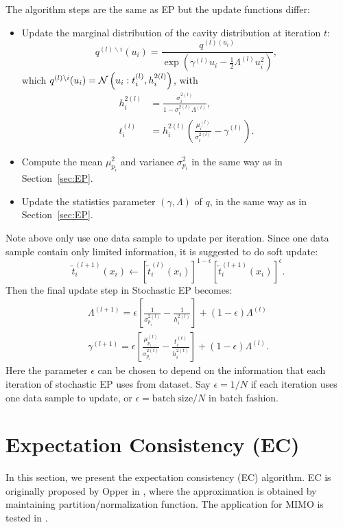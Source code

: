 \documentclass{article}
\begin{document}
The algorithm steps are the same as EP but the update functions differ:
\begin{itemize}
\item Update the marginal distribution of the cavity distribution at iteration $t$:
  \begin{equation}
    q^{(l)\backslash i}(u_i) = \frac{q^{(l)(u_i)}}{\exp\left( \gamma^{(l)}u_i - \frac{1}{2}\Lambda^{(l)}u_i^2 \right)} ,
  \end{equation}
  which $q^{(l)\backslash i}(u_i) = \mathcal{N}\left( u_i: t_i^{(l)}, h_i^{2(l)} \right)$, with
  \begin{align}
    h_i^{2 (l)} &= \frac{\sigma_i^{2 (l)}}{1-\sigma_i^{2 (l)} \Lambda^{(l)}}, \\
    t_i^{(l)} &= h_i^{2(l)}\left( \frac{\mu_i^{(l)}}{\sigma_i^{2(l)}} - {\gamma^{(l)}} \right).
  \end{align}
  

\item Compute the mean $\mu_{p_i}^2$ and variance $\sigma_{p_i}^2$ in the same way as in Section~\ref{sec:EP}.
\item Update the statistics parameter $\left( {\gamma}, {\Lambda} \right)$ of $q$, in the same way as in Section~\ref{sec:EP}.
\end{itemize}
Note above only use one data sample to update per iteration. Since one data sample contain only limited information, it is suggested to do soft update:
\begin{equation}
  \tilde{t}^{(l+1)}_i(x_i) \gets [\tilde{t}_i^{(l)}(x_i)]^{1-\epsilon} [\tilde{t}^{(l+1)}_i(x_i)]^{\epsilon}.
\end{equation}
Then the final update step in Stochastic EP becomes:
\begin{align}
  \Lambda^{(l+1)} = \epsilon\left[ \frac{1}{\sigma_{p_i}^{2(l)}} - \frac{1}{h_i^{2(l)}}  \right] + (1- \epsilon) \Lambda^{(l)}\\
  \gamma^{(l+1)} = \epsilon \left[  \frac{\mu_{p_i}^{(t)}}{\sigma_{p_i}^{2(t)}} - \frac{t_i^{(t)}}{h_i^{2(t)}} \right] + (1 - \epsilon) \Lambda^{(l)}.
\end{align}
Here the parameter $\epsilon$ can be chosen to depend on the information that each iteration of stochastic EP uses from dataset. Say $\epsilon  = 1/N$ if each iteration uses one data sample to update, or $\epsilon = \mathrm{batch~size}/N$ in batch fashion.

\section{Expectation Consistency (EC)}\label{sec:ec}
In this section, we present the expectation consistency (EC) algorithm. EC is originally proposed by Opper in \cite{opper2005ec}, where the approximation is obtained by maintaining partition/normalization function. The application for MIMO is tested in \cite{cespedes2018ecmimo}.
\end{document}
